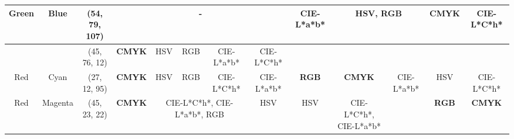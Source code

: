\begin{table}[htbp]
{\begin{tabular}{@{}ccclcccccccccc@{}}
    Green                   & \multicolumn{1}{c|}{Blue}                      & \multicolumn{2}{c|}{\cellcolor[HTML]{00FFFF}(54, 79, 107)} & \multicolumn{5}{c|}{-}                                                                                                                                                                                & \multicolumn{1}{c|}{CIE-L*a*b*}                      & \multicolumn{2}{c|}{HSV, \textbf{RGB}}                                                                   & \multicolumn{1}{c|}{\textbf{CMYK}}                & \multicolumn{1}{c|}{CIE-L*C*h*}                   \\ \midrule
                            & \multicolumn{1}{c|}{}                          & \multicolumn{2}{c|}{\cellcolor[HTML]{80FF00}(45, 76, 12)}  & \multicolumn{1}{c|}{\textbf{CMYK}}                         & \multicolumn{1}{c|}{HSV}           & \multicolumn{1}{c|}{RGB}        & \multicolumn{1}{c|}{CIE-L*a*b*} & \multicolumn{1}{c|}{CIE-L*C*h*} & \multicolumn{1}{c|}{}                                & \multicolumn{1}{c|}{}                                & \multicolumn{1}{c|}{}                             & \multicolumn{1}{c|}{}                             & \multicolumn{1}{c|}{}                             \\ \cmidrule(lr){3-9}
    \multirow{-2}{*}{Red}   & \multicolumn{1}{c|}{\multirow{-2}{*}{Cyan}}    & \multicolumn{2}{c}{\cellcolor[HTML]{7F00FF}(27, 12, 95)}   & \multicolumn{1}{c|}{\textbf{CMYK}}                         & \multicolumn{1}{c|}{HSV}           & \multicolumn{1}{c|}{RGB}        & \multicolumn{1}{c|}{CIE-L*C*h*} & \multicolumn{1}{c|}{CIE-L*a*b*} & \multicolumn{1}{c|}{\multirow{-2}{*}{\textbf{RGB}}}  & \multicolumn{1}{c|}{\multirow{-2}{*}{\textbf{CMYK}}} & \multicolumn{1}{c|}{\multirow{-2}{*}{CIE-L*a*b*}} & \multicolumn{1}{c|}{\multirow{-2}{*}{HSV}}        & \multicolumn{1}{c|}{\multirow{-2}{*}{CIE-L*C*h*}} \\ \midrule
    Red                     & \multicolumn{1}{c|}{Magenta}                   & \multicolumn{2}{c|}{\cellcolor[HTML]{FF0080}(45, 23, 22)}  & \multicolumn{1}{c|}{\textbf{CMYK}}                         & \multicolumn{3}{c|}{CIE-L*C*h*, CIE-L*a*b*, RGB}                                                       & \multicolumn{1}{c|}{HSV}        & \multicolumn{1}{c|}{HSV}                             & \multicolumn{1}{c|}{CIE-L*C*h*, CIE-L*a*b*}          & \multicolumn{1}{c|}{}                             & \multicolumn{1}{c|}{\textbf{RGB}}                 & \multicolumn{1}{c|}{\textbf{CMYK}}                \\ \midrule

\end{tabular}}
\end{table}
